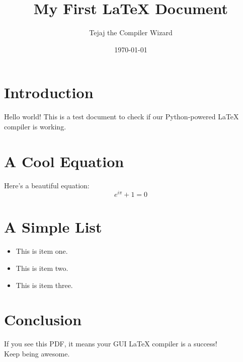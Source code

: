 \documentclass{article}
\title{My First LaTeX Document}
\author{Tejaj the Compiler Wizard}
\date{\today}
\begin{document}
\maketitle

\section{Introduction}
Hello world! This is a test document to check if our Python-powered LaTeX compiler is working.

\section{A Cool Equation}
Here's a beautiful equation:
\[
e^{i\pi} + 1 = 0
\]

\section{A Simple List}
\begin{itemize}
    \item This is item one.
    \item This is item two.
    \item This is item three.
\end{itemize}

\section{Conclusion}
If you see this PDF, it means your GUI LaTeX compiler is a success! \\
Keep being awesome.
\end{document}
